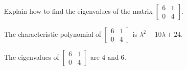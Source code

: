 
\begin{exerciseStatement}


Explain how to find the eigenvalues of the matrix \( \left[\begin{array}{cc}
6 & 1 \\
0 & 4
\end{array}\right] \).


\end{exerciseStatement}
    
\begin{exerciseAnswer} 


The characteristic polynomial of \( \left[\begin{array}{cc}
6 & 1 \\
0 & 4
\end{array}\right] \) is \( \lambda^{2} - 10 \lambda + 24 \).



The eigenvalues of \( \left[\begin{array}{cc}
6 & 1 \\
0 & 4
\end{array}\right] \) are \( 4 \) and \( 6 \).


\end{exerciseAnswer}
    
